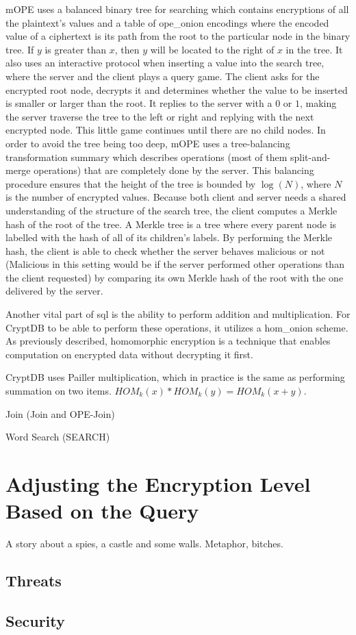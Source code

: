 \Gls{mOPE} uses a balanced binary tree for searching which contains encryptions of all the plaintext's values and a table of \Gls{ope_onion} encodings where the encoded value of a ciphertext is its path from the root to the particular node in the binary tree. If $y$ is greater than $x$, then $y$ will be located to the right of $x$ in the tree. It also uses an interactive protocol when inserting a value into the search tree, where the server and the client plays a query game. The client asks for the encrypted root node, decrypts it and determines whether the value to be inserted is smaller or larger than the root. It replies to the server with a $0$ or $1$, making the server traverse the tree to the left or right and replying with the next encrypted node. This little game continues until there are no child nodes. In order to avoid the tree being too deep, \Gls{mOPE} uses a tree-balancing transformation summary which describes operations (most of them split-and-merge operations) that are completely done by the server. This balancing procedure ensures that the height of the tree is bounded by $\log(N)$, where $N$ is the number of encrypted values. Because both client and server needs a shared understanding of the structure of the search tree, the client computes a Merkle hash of the root of the tree. A Merkle tree is a tree where every parent node is labelled with the hash of all of its children's labels.\cite{Merkle} By performing the Merkle hash, the client is able to check whether the server behaves malicious or not (Malicious in this setting would be if the server performed other operations than the client requested) by comparing its own Merkle hash of the root with the one delivered by the server.



Another vital part of \Gls{sql} is the ability to perform addition and multiplication. For CryptDB to be able to perform these operations, it utilizes a \Gls{hom_onion} scheme. As previously described, homomorphic encryption is a technique that enables computation on encrypted data without decrypting it first.

CryptDB uses Pailler multiplication, which in practice is the same as performing summation on two items. $HOM_k(x) * HOM_k(y) = HOM_k(x + y)$.


Join (Join and OPE-Join)


Word Search (SEARCH)


\section{Adjusting the Encryption Level Based on the Query}
\label{adjust_enc_level}

A story about a spies, a castle and some walls. Metaphor, bitches.


\subsection{Threats}

\subsection{Security}